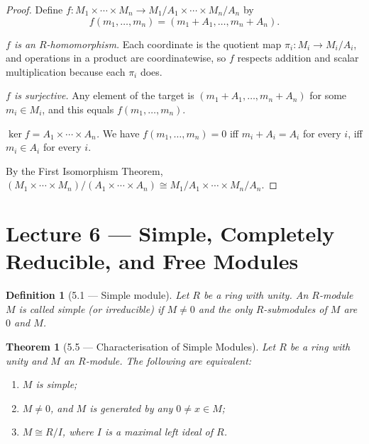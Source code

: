 \documentclass[12pt]{article}
\newtheorem{theorem}{Theorem}
\newtheorem{definition}{Definition}
\begin{document}
\begin{proof}
Define $f : M_1 \times \cdots \times M_n \to M_1/A_1 \times \cdots \times M_n/A_n$ by
\[
  f(m_1, \ldots, m_n) = (m_1 + A_1, \ldots, m_n + A_n).
\]

\textit{$f$ is an $R$-homomorphism.} Each coordinate is the quotient map $\pi_i : M_i \to M_i/A_i$, and operations in a product are coordinatewise, so $f$ respects addition and scalar multiplication because each $\pi_i$ does.

\textit{$f$ is surjective.} Any element of the target is $(m_1 + A_1, \ldots, m_n + A_n)$ for some $m_i \in M_i$, and this equals $f(m_1, \ldots, m_n)$.

\textit{$\ker f = A_1 \times \cdots \times A_n$.} We have $f(m_1, \ldots, m_n) = 0$ iff $m_i + A_i = A_i$ for every $i$, iff $m_i \in A_i$ for every $i$.

By the First Isomorphism Theorem, $(M_1 \times \cdots \times M_n)/(A_1 \times \cdots \times A_n) \cong M_1/A_1 \times \cdots \times M_n/A_n$.
\end{proof}

\section*{Lecture 6 — Simple, Completely Reducible, and Free Modules}

\begin{definition}[5.1 — Simple module]
Let $R$ be a ring with unity. An $R$-module $M$ is called \emph{simple} (or \emph{irreducible}) if $M \neq 0$ and the only $R$-submodules of $M$ are $0$ and $M$.
\end{definition}

\begin{theorem}[5.5 — Characterisation of Simple Modules]
Let $R$ be a ring with unity and $M$ an $R$-module. The following are equivalent:
\begin{enumerate}[label=(\roman*)]
  \item $M$ is simple;
  \item $M \neq 0$, and $M$ is generated by any $0 \neq x \in M$;
  \item $M \cong R/I$, where $I$ is a maximal left ideal of $R$.
\end{enumerate}
\end{theorem}
\end{document}

